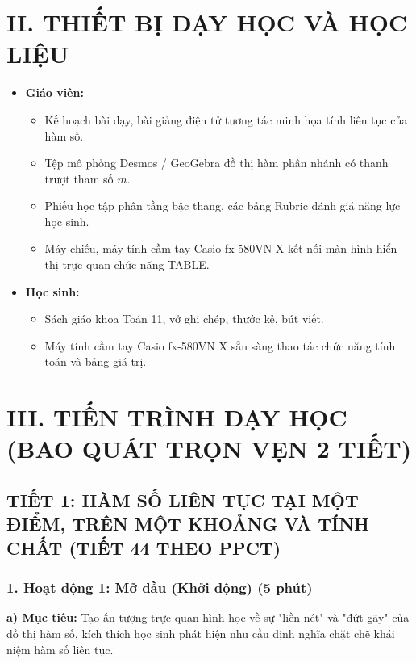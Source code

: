 \documentclass[12pt, a4paper]{article}
\begin{document}
\section*{II. THIẾT BỊ DẠY HỌC VÀ HỌC LIỆU}

\begin{itemize}[leftmargin=1.2cm]
    \item \textbf{Giáo viên:}
    \begin{itemize}[leftmargin=0.6cm]
        \item Kế hoạch bài dạy, bài giảng điện tử tương tác minh họa tính liên tục của hàm số.
        \item Tệp mô phỏng Desmos / GeoGebra đồ thị hàm phân nhánh có thanh trượt tham số $m$.
        \item Phiếu học tập phân tầng bậc thang, các bảng Rubric đánh giá năng lực học sinh.
        \item Máy chiếu, máy tính cầm tay Casio fx-580VN X kết nối màn hình hiển thị trực quan chức năng TABLE.
    \end{itemize}
    \item \textbf{Học sinh:}
    \begin{itemize}[leftmargin=0.6cm]
        \item Sách giáo khoa Toán 11, vở ghi chép, thước kẻ, bút viết.
        \item Máy tính cầm tay Casio fx-580VN X sẵn sàng thao tác chức năng tính toán và bảng giá trị.
    \end{itemize}
\end{itemize}

\section*{III. TIẾN TRÌNH DẠY HỌC (BAO QUÁT TRỌN VẸN 2 TIẾT)}

\subsection*{TIẾT 1: HÀM SỐ LIÊN TỤC TẠI MỘT ĐIỂM, TRÊN MỘT KHOẢNG VÀ TÍNH CHẤT (TIẾT 44 THEO PPCT)}

\subsubsection*{1. Hoạt động 1: Mở đầu (Khởi động) (5 phút)}

\noindent \textbf{a) Mục tiêu:}
Tạo ấn tượng trực quan hình học về sự "liền nét" và "đứt gãy" của đồ thị hàm số, kích thích học sinh phát hiện nhu cầu định nghĩa chặt chẽ khái niệm hàm số liên tục.
\end{document}
